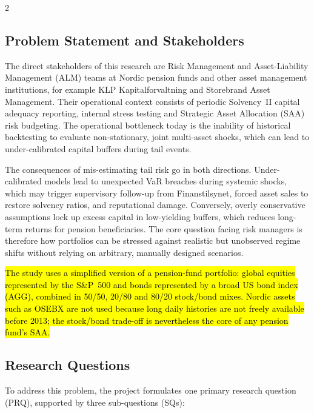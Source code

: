 \documentclass[12pt]{spieman}  %
\newcommand{\new}[1]{\hl{#1}}
\begin{document}
\begin{spacing}{2}
\subsection{Problem Statement and Stakeholders}
\label{sect:problem}

The direct stakeholders of this research are Risk Management and Asset-Liability Management (ALM) teams at Nordic pension funds and other asset management institutions, for example KLP Kapitalforvaltning and Storebrand Asset Management. Their operational context consists of periodic Solvency~II capital adequacy reporting, internal stress testing and Strategic Asset Allocation (SAA) risk budgeting. The operational bottleneck today is the inability of historical backtesting to evaluate non-stationary, joint multi-asset shocks, which can lead to under-calibrated capital buffers during tail events.

The consequences of mis-estimating tail risk go in both directions. Under-calibrated models lead to unexpected VaR breaches during systemic shocks, which may trigger supervisory follow-up from Finanstilsynet, forced asset sales to restore solvency ratios, and reputational damage. Conversely, overly conservative assumptions lock up excess capital in low-yielding buffers, which reduces long-term returns for pension beneficiaries. The core question facing risk managers is therefore how portfolios can be stressed against realistic but unobserved regime shifts without relying on arbitrary, manually designed scenarios.

\new{The study uses a simplified version of a pension-fund portfolio: global equities represented by the S\&P~500 and bonds represented by a broad US bond index (AGG), combined in 50/50, 20/80 and 80/20 stock/bond mixes. Nordic assets such as OSEBX are not used because long daily histories are not freely available before 2013; the stock/bond trade-off is nevertheless the core of any pension fund's SAA.}

\subsection{Research Questions}
\label{sect:rq}

To address this problem, the project formulates one primary research question (PRQ), supported by three sub-questions (SQs):


\end{spacing}
\end{document}
